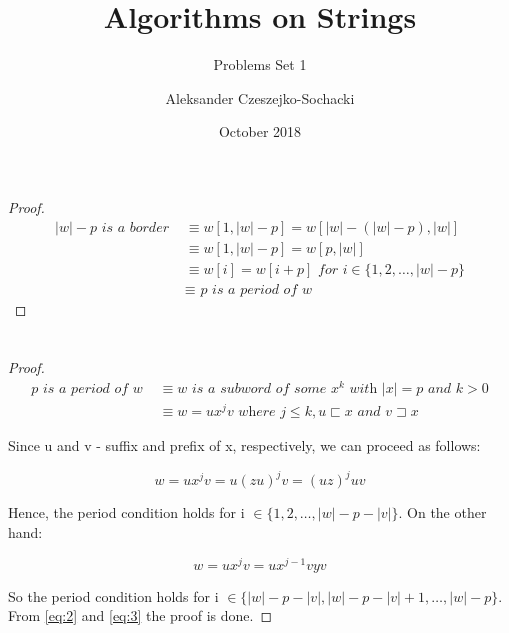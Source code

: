 \documentclass{scrartcl}
\title{Algorithms on Strings}
\subtitle{Problems Set 1}
\author{Aleksander Czeszejko-Sochacki}
\date{October 2018}
\begin{document}
\maketitle

\section{}
  \begin{proof}
    \begin{equation}\label{eq:1}
      \begin{split}
        |w| - p \textit{ is a border } &\equiv w[1, |w| - p] = w[|w| - (|w| - p), |w|] \\
        &\equiv w[1, |w| - p] = w[p, |w|] \\
        &\equiv w[i] = w[i + p] \textit{ for } i \in \{1, 2, \dots, |w| - p\} \\
        &\equiv \textit{ p is a period of w}
      \end{split}
    \end{equation}
  \end{proof}
\section{}

  \subsection{}
    \begin{proof}
      \begin{equation}
        \begin{split}
          \textit{p is a period of w } &\equiv 
          \textit{w is a subword of some } x^k \textit{ with } |x| = p \textit{ and } k > 0 \\ 
          &\equiv w = ux^jv \textit{ where } j \leq k, u \sqsubset x \textit{ and } v \sqsupset x
        \end{split}
      \end{equation}

      Since u and v - suffix and prefix of x, respectively, we can proceed as follows:

      \begin{equation}\label{eq:2}
        w = ux^jv = u(zu)^jv = (uz)^juv
      \end{equation}
    
      Hence, the period condition holds for i $\in \{1, 2, \dots, |w| - p - |v|\}$. On the other hand:

      \begin{equation}\label{eq:3}
        w = ux^jv = ux^{j - 1}vyv
      \end{equation}

      So the period condition holds for i $\in \{|w| - p - |v|, |w| - p - |v| + 1, \dots, |w| - p\}$.
      From \ref{eq:2} and \ref{eq:3} the proof is done.
    \end{proof}
    
\end{document}
